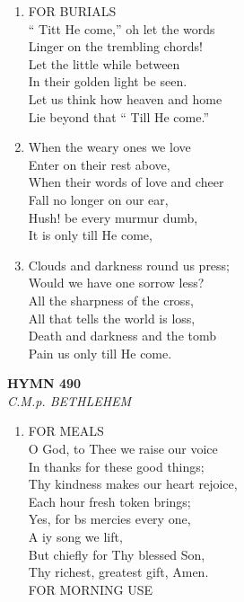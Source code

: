 \documentclass[11pt,a4paper]{article}
\begin{document}
\begin{enumerate}
    \item FOR BURIALS \\
        `` Titt He come,'' oh let the words \\
        Linger on the trembling chords! \\
        Let the little while between \\
        In their golden light be seen. \\
        Let us think how heaven and home \\
        Lie beyond that `` Till He come.''

    \item When the weary ones we love \\
        Enter on their rest above, \\
        When their words of love and cheer \\
        Fall no longer on our ear, \\
        Hush! be every murmur dumb, \\
        It is only till He come,

    \item Clouds and darkness round us press; \\
        Would we have one sorrow less? \\
        All the sharpness of the cross, \\
        All that tells the world is loss, \\
        Death and darkness and the tomb \\
        Pain us only till He come.

\end{enumerate}

\newpage
\begin{center}
    {\Large \textbf{HYMN 490}}
    \\
    \textit{C.M.p. BETHLEHEM}
\end{center}
\vspace{1em}

\begin{enumerate}
    \item FOR MEALS \\
        O God, to Thee we raise our voice \\
        In thanks for these good things; \\
        Thy kindness makes our heart rejoice, \\
        Each hour fresh token brings; \\
        Yes, for bs mercies every one, \\
        A iy song we lift, \\
        But chiefly for Thy blessed Son, \\
        Thy richest, greatest gift, Amen. \\
        FOR MORNING USE

\end{enumerate}
\end{document}
